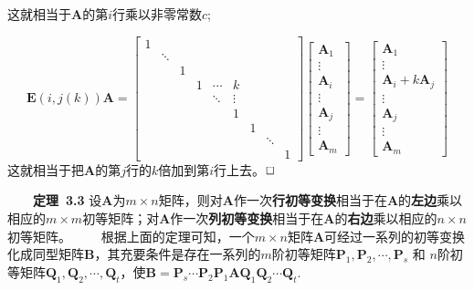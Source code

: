 \documentclass[compress,mathserif,cjk]{beamer}
\theoremstyle{remark}
\numberwithin{equation}{section}
\newcommand{\hei}{\bf}      %
\begin{document}
\begin{CJK}{UTF8}{gbsn}
\begin{frame}
这就相当于$\bm A$的第$i$行乘以非零常数$c$;
\end{frame}
\begin{frame}\small
$$\bm E(i,j(k))\bm A=\left[\begin{matrix}1&&&&&&&&\\ &\ddots&&&&&&&\\&&1&&&&&&\\&&&1&\cdots&k&&&\\&&&&\ddots&\vdots&&&\\ &&&&&1&&&\\&&&&&&1&&\\&&&&&&&\ddots&\\&&&&&&&&1\end{matrix}\right]
\left[\begin{matrix}\bm A_1\\\vdots\\\bm A_i\\\vdots\\\bm A_j\\\vdots\\\bm A_m\end{matrix}\right]
=\left[\begin{matrix}\bm A_1\\\vdots\\\bm A_i+k\bm A_j\\\vdots\\\bm A_j\\\vdots\\\bm A_m\end{matrix}\right]$$
这就相当于把$\bm A$的第$j$行的$k$倍加到第$i$行上去。$\hfill\Box$
\end{frame}

\begin{frame}
 \ \ \ \ {\hei 定理~3.3} 设$\bm A$为$m\times n$矩阵，则对$\bm A$作一次{\hei 行初等变换}相当于在$\bm A$的{\hei 左边}乘以相应的$m\times m$初等矩阵；对$\bm A$作一次{\hei 列初等变换}相当于在$\bm A$的{\hei 右边}乘以相应的$n\times n$初等矩阵。
 \pause \vskip 10pt
 \ \ \ \ 根据上面的定理可知，一个$m\times n$矩阵$\bm A$可经过一系列的初等变换化成同型矩阵$\bm B$，其充要条件是存在一系列的$m$阶初等矩阵$\bm P_1,\bm P_2,\cdots,\bm P_s$ 和
  $n$阶初等矩阵$\bm Q_1,\bm Q_2,\cdots,\bm Q_t$，使$\bm B=\bm P_s\cdots\bm P_2\bm P_1\bm A\bm Q_1\bm Q_2\cdots\bm Q_t$.
\end{frame}


\end{CJK}
\end{document}
